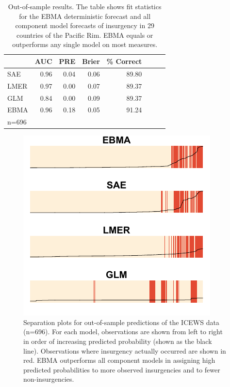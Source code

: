 \documentclass[pdftex,12pt,fullpage,oneside]{amsart}
\begin{document}
\begin{table}
\small
\begin{center}
\vspace{-20pt}
  \caption{\footnotesize Out-of-sample results. The table shows fit
    statistics for the EBMA deterministic forecast and all component
    model forecasts of insurgency in 29 countries of the Pacific
    Rim. EBMA equals or outperforms any single model on most
    measures.}\label{OutSam1}
\begin{tabular}{l rrrrrrr}
  \toprule
 & AUC & PRE & Brier & \% Correct \\ 
  \midrule
  SAE &  0.96 & 0.04 & 0.06 & 89.80 \\ 
  LMER & 0.97 & 0.00 & 0.07 & 89.37\\ 
  GLM & 0.84 & 0.00 & 0.09 & 89.37\\ 
  EBMA & 0.96 & 0.18 & 0.05 & 91.24 \\ 
   \bottomrule
n=696 \\
\end{tabular}
\end{center}
\vspace{-25pt}
\end{table}



\begin{figure}
\hspace{-10pt}
\vspace{-20pt}
  \caption{\footnotesize Separation plots for out-of-sample
    predictions of the ICEWS data (n=696). For each model,
    observations are shown from left to right in order of increasing
    predicted probability (shown as the black line). Observations
    where insurgency actually occurred are shown in red. EBMA
    outperforms all component models in assigning high predicted
    probabilities to more observed insurgencies and to fewer
    non-insurgencies.}
\label{OutSam1sep}
\centering
\includegraphics[]{OutSampleNew.pdf}
\vspace{-25pt}
\end{figure}
\end{document}
